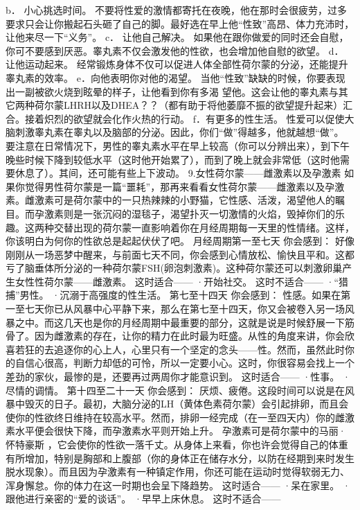 \documentclass[12pt,UTF8]{ctexbook}
\begin{document}
b． 小心挑选时间。
不要将性爱的激情都寄托在夜晚，他在那时会很疲劳，过多要求只会让你搬起石头砸了自己的脚。最好选在早上他“性致”高昂、体力充沛时，让他来尽一下“义务”。
c． 让他自己解决。
如果他在跟你做爱的同时还会自慰，你可不要感到厌恶。睾丸素不仅会激发他的性欲，也会增加他自慰的欲望。
d． 让他运动起来。
经常锻炼身体不仅可以促进人体全部性荷尔蒙的分泌，还能提升睾丸素的效率。
e．向他表明你对他的渴望。
当他“性致”缺缺的时候，你要表现出一副被欲火烧到眩晕的样子，让他看到你有多渴 望他。这会让他的睾丸素与其它两种荷尔蒙LHRH以及DHEA？？（都有助于将他萎靡不振的欲望提升起来）汇合。接着炽烈的欲望就会化作火热的行动。
f．有更多的性生活。
性爱可以促使大脑刺激睾丸素在睾丸以及脑部的分泌。因此，你们“做”得越多，他就越想“做”。
要注意在日常情况下，男性的睾丸素水平在早上较高（你可以分辨出来），到下午晚些时候下降到较低水平（这时他开始累了），而到了晚上就会非常低（这时他需要休息了）。其间，还可能有些上下波动。
9.女性荷尔蒙——雌激素以及孕激素
如果你觉得男性荷尔蒙是一篇“噩耗”，那再来看看女性荷尔蒙——雌激素以及孕激素。雌激素可是荷尔蒙中的一只热辣辣的小野猫，它性感、活泼，渴望他人的瞩目。而孕激素则是一张沉闷的湿毯子，渴望扑灭一切激情的火焰，毁掉你们的乐趣。这两种交替出现的荷尔蒙一直影响着你在月经周期每一天里的性情绪。这样，你该明白为何你的性欲总是起起伏伏了吧。
月经周期第一至七天
你会感到：
好像刚刚从一场恶梦中醒来，与前面七天不同，你会感到心情放松、愉快且平和。这都亏了脑垂体所分泌的一种荷尔蒙FSH(卵泡刺激素)。这种荷尔蒙还可以刺激卵巢产生女性性荷尔蒙——雌激素。
这时适合——
·开始社交。
这时不适合——
·“猎捕”男性。
·沉溺于高强度的性生活。
第七至十四天
你会感到：
性感。如果在第一至七天你已从风暴中心平静下来，那么在第七至十四天，你又会被卷入另一场风暴之中。而这几天也是你的月经周期中最重要的部分，这就是说是时候舒展一下筋骨了。因为雌激素的存在，让你的精力在此时最为旺盛。从性的角度来讲，你会欣喜若狂的去追逐你的心上人，心里只有一个坚定的念头——性。然而，虽然此时你的自信心很高，判断力却低的可怜，所以一定要小心。这时，你很容易会找上一个差劲的家伙，最惨的是，还要再过两周你才能意识到。
这时适合——
·性事。
·尽情的调情。
第十四至二十一天
你会感到：
厌烦、疲倦。这段时间可以说是在风暴中毁灭的日子。最初，大脑分泌的LH（黄体色素荷尔蒙）会引起排卵，而且会使你的性欲终日维持在较高水平。然而，排卵一经完成（在一至四天内）你的雌激素水平便会很快下降，而孕激素水平则开始上升。
孕激素可是荷尔蒙中的马丽·怀特豪斯 ，它会使你的性欲一落千丈。从身体上来看，你也许会觉得自己的体重有所增加，特别是胸部和上腹部（你的身体正在储存水分，以防在经期到来时发生脱水现象）。而且因为孕激素有一种镇定作用，你还可能在运动时觉得软弱无力、浑身懈怠。你的体力在这一时期也会呈下降趋势。
这时适合——
·呆在家里。
·跟他进行亲密的“爱的谈话”。
·早早上床休息。
这时不适合——
\end{document}
